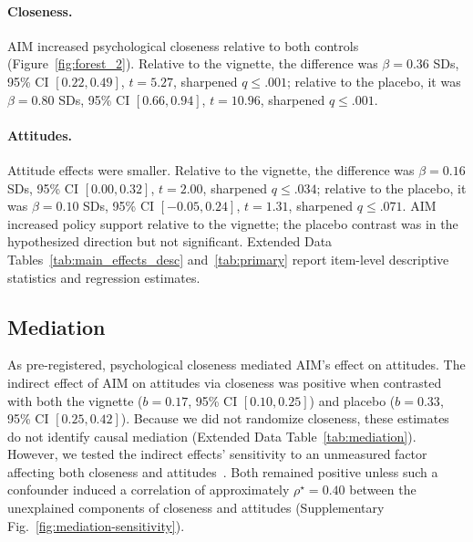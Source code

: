 \documentclass[11pt]{article}
\begin{document}
\paragraph{Closeness.} AIM increased psychological closeness relative to both controls (Figure~\ref{fig:forest_2}). Relative to the vignette, the difference was $\beta=0.36$ SDs, 95\% CI $[0.22,0.49]$, $t=5.27$, sharpened $q\leq.001$; relative to the placebo, it was $\beta=0.80$ SDs, 95\% CI $[0.66,0.94]$, $t=10.96$, sharpened $q\leq.001$.

\paragraph{Attitudes.} Attitude effects were smaller. Relative to the vignette, the difference was $\beta=0.16$ SDs, 95\% CI $[0.00,0.32]$, $t=2.00$, sharpened $q\leq.034$; relative to the placebo, it was $\beta=0.10$ SDs, 95\% CI $[-0.05,0.24]$, $t=1.31$, sharpened $q\leq.071$. AIM increased policy support relative to the vignette; the placebo contrast was in the hypothesized direction but not significant. Extended Data Tables~\ref{tab:main_effects_desc} and~\ref{tab:primary} report item-level descriptive statistics and regression estimates.



\subsection{Mediation}
\label{sec:study-1-science-funding-mediation}

As pre-registered, psychological closeness mediated AIM's effect on attitudes. The indirect effect of AIM on attitudes via closeness was positive when contrasted with both the vignette ($b=0.17$, 95\% CI $[0.10,0.25]$) and placebo ($b=0.33$, 95\% CI $[0.25,0.42]$). Because we did not randomize closeness, these estimates do not identify causal mediation (Extended Data Table~\ref{tab:mediation}). However, we tested the indirect effects' sensitivity to an unmeasured factor affecting both closeness and attitudes~\citep{imai_identification_2010}. Both remained positive unless such a confounder induced a correlation of approximately $\rho^{\star}=0.40$ between the unexplained components of closeness and attitudes (Supplementary Fig.~\ref{fig:mediation-sensitivity}).
\end{document}
